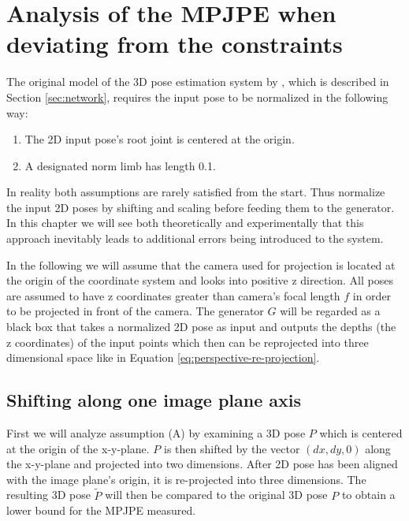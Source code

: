\section{Analysis of the MPJPE when deviating from the constraints}

The original model of the 3D pose estimation system by \citet{drover18}, which is described in Section \ref{sec:network}, requires the input pose to be normalized in the following way:
\begin{enumerate}[label=(\Alph*)]
	\item The 2D input pose's root joint is centered at the origin.
	\item A designated norm limb has length 0.1.
\end{enumerate}

In reality both assumptions are rarely satisfied from the start.
Thus \citet{drover18} normalize the input 2D poses by shifting and scaling before feeding them to the generator.
In this chapter we will see both theoretically and experimentally that this approach inevitably leads to additional errors being introduced to the system.


In the following we will assume that the camera used for projection is located at the origin of the coordinate system and looks into positive z direction.
All poses are assumed to have z coordinates greater than camera's focal length $f$ in order to be projected in front of the camera.
The generator $G$ will be regarded as a black box that takes a normalized 2D pose as input and outputs the depths (the z coordinates) of the input points which then can be reprojected into three dimensional space like in Equation \eqref{eq:perspective-re-projection}.

\subsection{Shifting along one image plane axis}
\label{sec:x-shift-error}
First we will analyze assumption (A) by examining a 3D pose $P$ which is centered at the origin of the x-y-plane.
$P$ is then shifted by the vector $(dx, dy, 0)$ along the x-y-plane and projected into two dimensions.
After 2D pose has been aligned with the image plane's origin, it is re-projected into three dimensions.
The resulting 3D pose $\widetilde{P}$ will then be compared to the original 3D pose $P$ to obtain a lower bound for the MPJPE measured.

